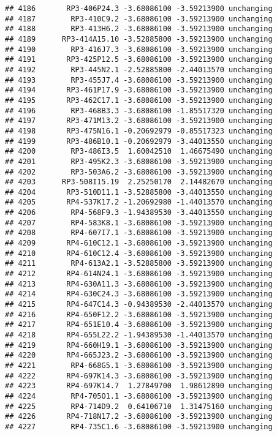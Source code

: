 \documentclass[]{article}
\begin{document}
\begin{verbatim}
## 4186       RP3-406P24.3 -3.68086100 -3.59213900 unchanging
## 4187        RP3-410C9.2 -3.68086100 -3.59213900 unchanging
## 4188        RP3-413H6.2 -3.68086100 -3.59213900 unchanging
## 4189      RP3-414A15.10 -3.52885800 -3.59213900 unchanging
## 4190        RP3-416J7.3 -3.68086100 -3.59213900 unchanging
## 4191       RP3-425P12.5 -3.68086100 -3.59213900 unchanging
## 4192        RP3-445N2.1 -2.52885800 -2.44013570 unchanging
## 4193        RP3-455J7.4 -3.68086100 -3.59213900 unchanging
## 4194       RP3-461P17.9 -3.68086100 -3.59213900 unchanging
## 4195       RP3-462C17.1 -3.68086100 -3.59213900 unchanging
## 4196        RP3-468B3.3 -3.68086100 -1.85517320 unchanging
## 4197       RP3-471M13.2 -3.68086100 -3.59213900 unchanging
## 4198       RP3-475N16.1 -0.20692979 -0.85517323 unchanging
## 4199       RP3-486B10.1 -0.20692979 -3.44013550 unchanging
## 4200        RP3-486I3.5  1.60042510  1.46675490 unchanging
## 4201        RP3-495K2.3 -3.68086100 -3.59213900 unchanging
## 4202        RP3-503A6.2 -3.68086100 -3.59213900 unchanging
## 4203      RP3-508I15.19  2.25250170  2.14482670 unchanging
## 4204       RP3-510D11.1 -3.52885800 -3.44013550 unchanging
## 4205       RP4-537K17.2 -1.20692980 -1.44013570 unchanging
## 4206        RP4-568F9.3 -1.94389530 -3.44013550 unchanging
## 4207        RP4-583K8.1 -3.68086100 -3.59213900 unchanging
## 4208        RP4-607I7.1 -3.68086100 -3.59213900 unchanging
## 4209       RP4-610C12.1 -3.68086100 -3.59213900 unchanging
## 4210       RP4-610C12.4 -3.68086100 -3.59213900 unchanging
## 4211        RP4-613A2.1 -3.52885800 -3.59213900 unchanging
## 4212       RP4-614N24.1 -3.68086100 -3.59213900 unchanging
## 4213       RP4-630A11.3 -3.68086100 -3.59213900 unchanging
## 4214       RP4-630C24.3 -3.68086100 -3.59213900 unchanging
## 4215       RP4-647C14.3 -0.94389530 -2.44013570 unchanging
## 4216       RP4-650F12.2 -3.68086100 -3.59213900 unchanging
## 4217       RP4-651E10.4 -3.68086100 -3.59213900 unchanging
## 4218       RP4-655L22.2 -1.94389530 -1.44013570 unchanging
## 4219       RP4-660H19.1 -3.68086100 -3.59213900 unchanging
## 4220       RP4-665J23.2 -3.68086100 -3.59213900 unchanging
## 4221        RP4-668G5.1 -3.68086100 -3.59213900 unchanging
## 4222       RP4-697K14.3 -3.68086100 -3.59213900 unchanging
## 4223       RP4-697K14.7  1.27849700  1.98612890 unchanging
## 4224        RP4-705O1.1 -3.68086100 -3.59213900 unchanging
## 4225        RP4-714D9.2  0.64106710  1.31475160 unchanging
## 4226       RP4-718N17.2 -3.68086100 -3.59213900 unchanging
## 4227        RP4-735C1.6 -3.68086100 -3.59213900 unchanging

\end{verbatim}
\end{document}
